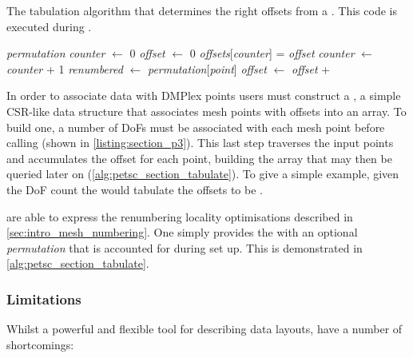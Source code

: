\documentclass[thesis]{subfiles}
\begin{document}
\begin{algorithm}
  \caption{
    The tabulation algorithm that determines the right offsets from a .
    This code is executed during .
  }

  \begin{algorithmic}[1]
    \Require \textit{permutation}
    \State \textit{counter} $\gets$ 0
    \State \textit{offset} $\gets$ 0
      \State \textit{offsets}[\textit{counter}] = \textit{offset}
      \State \textit{counter} $\gets$ \textit{counter} + 1
      \State \textit{renumbered} $\gets$ \textit{permutation}[\textit{point}]
      \State \textit{offset} $\gets$ \textit{offset} + 
    \EndFor
  \end{algorithmic}

  \label{alg:petsc_section_tabulate}
\end{algorithm}

In order to associate data with DMPlex points users must construct a , a simple CSR-like data structure that associates mesh points with offsets into an array.
To build one, a number of DoFs must be associated with each mesh point before calling  (shown in \cref{listing:section_p3}).
This last step traverses the input points and accumulates the offset for each point, building the array that may then be queried later on (\cref{alg:petsc_section_tabulate}).
To give a simple example, given the DoF count \ccode{[1, 0, 3, 2, 0, 1]} the  would tabulate the offsets to be \ccode{[0, 1, 1, 4, 6, 6]}.

 are able to express the renumbering locality optimisations described in \cref{sec:intro_mesh_numbering}.
One simply provides the  with an optional \emph{permutation} that is accounted for during set up.
This is demonstrated in \cref{alg:petsc_section_tabulate}.

\subsubsection{Limitations}

Whilst a powerful and flexible tool for describing data layouts,  have a number of shortcomings:
\end{document}
